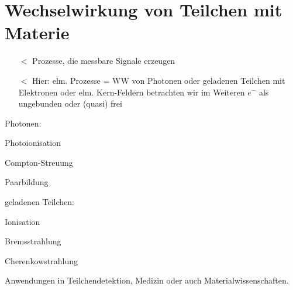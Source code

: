 \section{Wechselwirkung von Teilchen mit Materie}
\begin{itemize}
\item[$\lt$] Prozesse, die messbare Signale erzeugen
\item[$\lt$] Hier: elm. Prozesse = WW von Photonen oder geladenen Teilchen mit Elektronen oder elm. Kern-Feldern betrachten wir im Weiteren $e^-$ als ungebunden oder (quasi) frei
\end{itemize}
Photonen:
\begin{compactitem}
\item Photoionisation
\item Compton-Streuung
\item Paarbildung
\end{compactitem}
geladenen Teilchen:
\begin{compactitem}
\item Ionisation
\item Bremsstrahlung
\item Cherenkowstrahlung
\end{compactitem}
Anwendungen in Teilchendetektion, Medizin oder auch Materialwissenschaften.

